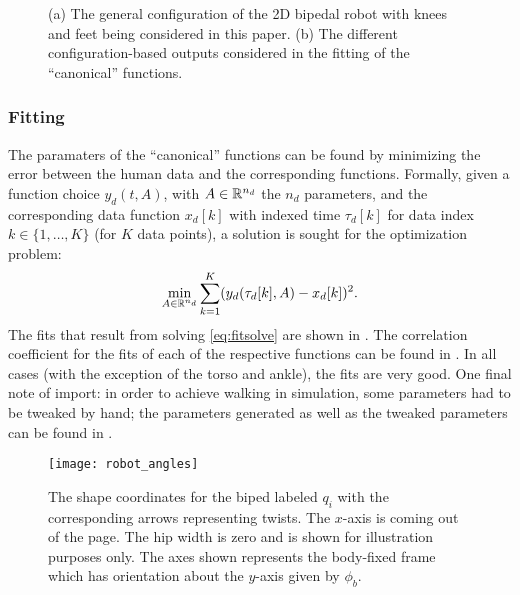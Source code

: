\begin{figure}[t!]
  \centering
  \hspace{.2cm}
  \caption[(a) The general configuration of the 2D bipedal robot]{(a) The general configuration of the 2D bipedal robot with knees and feet being considered in this paper. (b) The different configuration-based outputs considered in the fitting of the ``canonical'' functions.}
    \label{fig:robotconstraints}
\end{figure}

\subsubsection{Fitting} The paramaters of the ``canonical'' functions can be found by minimizing the error between the human data and the corresponding functions. Formally, given a function choice $y_d(t, A)$, with $A \in \mathbb{R}^{n_{d}}$ the $n_d$ parameters, and the corresponding data function $x_{d}[k]$ with indexed time $\tau_{d}[k]$ for data index $k \in \{1, \ldots, K\}$ (for $K$ data points),  a solution is sought for the optimization problem:
\begin{align}
  \label{eq:fitsolve}
  \min_{A \in \mathbb{R}^{n_{d}}} \sum_{k=1}^{K} (y_{d}(\tau_{d}[k], A) - x_{d}[k])^2.
\end{align}
The fits that result from solving \eqref{eq:fitsolve} are shown in . The correlation coefficient for the fits of each of the respective functions can be found in . In all cases (with the exception of the torso and ankle), the fits are very good. One final note of import: in order to achieve walking in simulation, some parameters had to be tweaked by hand; the parameters generated as well as the tweaked parameters can be found in .

\begin{figure}
  \centering
  \texttt{[image: robot\_angles]}
  \caption[The shape coordinates for the biped labeled $q_i$]{The shape coordinates for the biped labeled $q_i$ with the corresponding arrows representing twists. The $x$-axis is coming out of the page. The hip width is zero and is shown for illustration purposes only. The axes shown represents the body-fixed frame which has orientation about the $y$-axis given by $\phi_b$.}
  \label{fig:shapecoords}
\end{figure}

